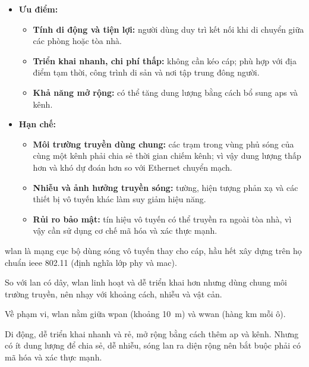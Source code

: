 \begin{itemize}
  \item \textbf{Ưu điểm:}
    \begin{itemize}
      \item \textbf{Tính di động và tiện lợi:} người dùng duy trì kết nối khi
        di chuyển giữa các phòng hoặc tòa nhà.
      \item \textbf{Triển khai nhanh, chi phí thấp:} không cần kéo cáp; phù hợp
        với địa điểm tạm thời, công trình di sản và nơi tập trung đông người.
      \item \textbf{Khả năng mở rộng:} có thể tăng dung lượng bằng cách bổ sung
        \acp{ap} và kênh.
    \end{itemize}
  \item \textbf{Hạn chế:}
    \begin{itemize}
      \item \textbf{Môi trường truyền dùng chung:} các trạm trong vùng phủ sóng
        của cùng một kênh phải chia sẻ thời gian chiếm kênh; vì vậy dung lượng
        thấp hơn và khó dự đoán hơn so với Ethernet chuyển mạch.
      \item \textbf{Nhiễu và ảnh hưởng truyền sóng:} tường, hiện tượng phản xạ
        và các thiết bị vô tuyến khác làm suy giảm hiệu năng.
      \item \textbf{Rủi ro bảo mật:} tín hiệu vô tuyến có thể truyền ra ngoài
        tòa nhà, vì vậy cần sử dụng cơ chế mã hóa và xác thực mạnh.
    \end{itemize}
\end{itemize}

\begin{tomtat}
\item \acs{wlan} là mạng cục bộ dùng sóng vô tuyến thay cho cáp, hầu hết xây dựng trên họ chuẩn \acs{ieee} 802.11 (định nghĩa lớp \acs{phy} và \acs{mac}).
\item So với \acs{lan} có dây, \acs{wlan} linh hoạt và dễ triển khai hơn nhưng dùng chung môi trường truyền, nên nhạy với khoảng cách, nhiễu và vật cản.
\item Về phạm vi, \acs{wlan} nằm giữa \acs{wpan} (khoảng 10~m) và \acs{wwan} (hàng km mỗi ô).
\item Di động, dễ triển khai nhanh và rẻ, mở rộng bằng cách thêm \acs{ap} và kênh. Nhưng có ít dung lượng để chia sẻ, dễ nhiễu, sóng lan ra diện rộng nên bắt buộc phải có mã hóa và xác thực mạnh.
\end{tomtat}
\endgroup

